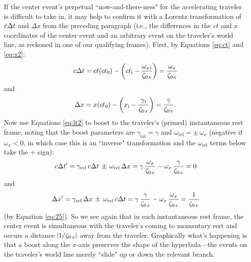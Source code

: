 \documentclass[12pt]{article}
\begin{document}
If the center event's perpetual ``now-and-there-ness" for the accelerating traveler is difficult to take in, it may help to confirm it with a Lorentz transformation of $c \mkern.5mu \Delta t $ and $\Delta x$ from the preceding paragraph (i.e., the differences in the $ct$ and $x$ coordinates of the center event and an arbitrary event on the traveler's world line, as reckoned in one of our qualifying frames). First, by Equations \ref{eq:ct} and \ref{eq:x2}:
\begin{equation*}
c \mkern.5mu \Delta t = ct(ct_0) - \left( ct_{\mathrm{i}} - \dfrac{\omega_{x \mkern2mu \textrm{i} }}{ \zeta_{0 \mkern2mu x}} \right) = \dfrac{\omega_x}{ \zeta_{0 \mkern2mu x}}
\end{equation*}
and
\begin{equation*}
\Delta x = x(ct_0) - \left( x_{\mathrm{i}} - \dfrac{\gamma_{\mkern1mu \textrm{i} }}{ \zeta_{0 \mkern2mu x}} \right) = \dfrac{\gamma}{ \zeta_{0 \mkern2mu x}} .
\end{equation*}
Now use Equations \ref{eq:lt2} to boost to the traveler's (primed) instantaneous rest frame, noting that the boost parameters are $\gamma_{\mathrm{rel}} = \gamma$ and $\omega_{\mathrm{rel}} = \pm \, \omega_x$ (negative if $\omega_x < 0$, in which case this is an ``inverse" transformation and the $\omega_{\textrm{rel}}$ terms below take the $+$ sign):
\begin{equation*}
c \mkern.5mu \Delta t^\prime = \gamma_{\textrm{rel}} \, c \mkern.5mu \Delta t \, \pm \, \omega_{\textrm{rel}} \, \Delta x = \gamma \, \dfrac{\omega_x}{ \zeta_{0 \mkern2mu x}} - \omega_x \, \dfrac{\gamma}{ \zeta_{0 \mkern2mu x}} = 0
\end{equation*}
and
\begin{equation*}
\Delta x^\prime = \gamma_{\textrm{rel}} \, \Delta x \, \pm \, \omega_{\textrm{rel}} \, c \mkern.5mu \Delta t = \gamma \, \dfrac{\gamma}{ \zeta_{0 \mkern2mu x}} - \omega_x \, \dfrac{\omega_x}{ \zeta_{0 \mkern2mu x}} = \dfrac{1}{ \zeta_{0 \mkern2mu x}}
\end{equation*}
(by Equation \ref{eq:25}). So we see again that in each instantaneous rest frame, the center event is simultaneous with the traveler's coming to momentary rest and occurs a distance $|1 / \zeta_{0 \mkern2mu x}|$ away from the traveler. Graphically what's happening is that a boost along the $x$-axis preserves the shape of the hyperbola---the events on the traveler's world line merely ``slide" up or down the relevant branch.
\end{document}
